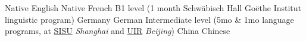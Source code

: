 \begin{cvhonors}

  \cvhonor
    {Native} %
    {} %
    {} %
    {English} %
  \cvhonor
    {Native} %
    {} %
    {} %
    {French} %
  \cvhonor
    {B1 level} %
    { (1 month Schwäbisch Hall Goëthe Institut linguistic program)} %
    {Germany} %
    {German} %
  \cvhonor
    {Intermediate level} %
    { (5mo \& 1mo language programs, at \href{http://en.shisu.edu.cn/}{SISU} \textit{Shanghai} and \href{https://www.uir.cn/english/}{UIR} \textit{Beijing}) } %
    {China} %
    {Chinese} %

\end{cvhonors}
